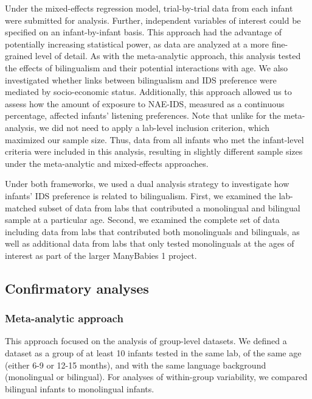 \documentclass[,man,floatsintext]{apa6}
\begin{document}
Under the mixed-effects regression model, trial-by-trial data from each infant were submitted for analysis. Further, independent variables of interest could be specified on an infant-by-infant basis. This approach had the advantage of potentially increasing statistical power, as data are analyzed at a more fine-grained level of detail. As with the meta-analytic approach, this analysis tested the effects of bilingualism and their potential interactions with age. We also investigated whether links between bilingualism and IDS preference were mediated by socio-economic status. Additionally, this approach allowed us to assess how the amount of exposure to NAE-IDS, measured as a continuous percentage, affected infants' listening preferences. Note that unlike for the meta-analysis, we did not need to apply a lab-level inclusion criterion, which maximized our sample size. Thus, data from all infants who met the infant-level criteria were included in this analysis, resulting in slightly different sample sizes under the meta-analytic and mixed-effects approaches.

Under both frameworks, we used a dual analysis strategy to investigate how infants' IDS preference is related to bilingualism. First, we examined the lab-matched subset of data from labs that contributed a monolingual and bilingual sample at a particular age. Second, we examined the complete set of data including data from labs that contributed both monolinguals and bilinguals, as well as additional data from labs that only tested monolinguals at the ages of interest as part of the larger ManyBabies 1 project.

\hypertarget{confirmatory-analyses}{%
\subsection{Confirmatory analyses}\label{confirmatory-analyses}}

\hypertarget{meta-analytic-approach}{%
\subsubsection{Meta-analytic approach}\label{meta-analytic-approach}}

This approach focused on the analysis of group-level datasets. We defined a dataset as a group of at least 10 infants tested in the same lab, of the same age (either 6-9 or 12-15 months), and with the same language background (monolingual or bilingual). For analyses of within-group variability, we compared bilingual infants to monolingual infants.
\end{document}
